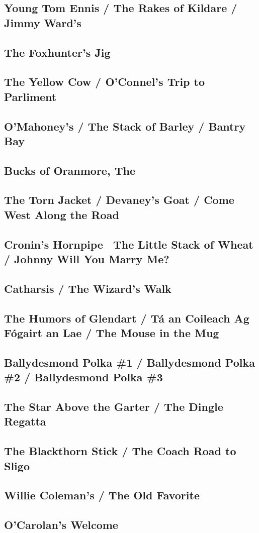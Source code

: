 \documentclass[11pt,letterpaper]{article}
\begin{document}
\subsection*{Young Tom Ennis / The Rakes of Kildare / Jimmy Ward's}
\subsection*{The Foxhunter's Jig}
\subsection*{The Yellow Cow / O'Connel's Trip to Parliment}
\subsection*{O'Mahoney's / The Stack of Barley / Bantry Bay}
\subsection*{Bucks of Oranmore, The}
\subsection*{The Torn Jacket / Devaney's Goat / Come West Along the Road}
\subsection*{Cronin's Hornpipe \ The Little Stack of Wheat / Johnny Will You Marry Me?}
\subsection*{Catharsis / The Wizard's Walk}
\subsection*{The Humors of Glendart / Tá an Coileach Ag Fógairt an Lae / The Mouse in the Mug}
\subsection*{Ballydesmond Polka \#1 / Ballydesmond Polka \#2 / Ballydesmond Polka \#3}
\subsection*{The Star Above the Garter / The Dingle Regatta}
\subsection*{The Blackthorn Stick / The Coach Road to Sligo}
\subsection*{Willie Coleman's / The Old Favorite}
\subsection*{O'Carolan's Welcome}
\end{document}
